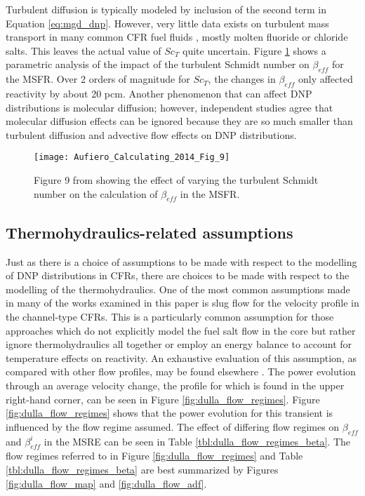 \documentclass[review]{elsarticle}
\begin{document}
Turbulent diffusion is typically modeled by inclusion of the second term in
Equation \ref{eq:mgd_dnp}. However, 
very little data exists on turbulent mass transport in many common
CFR fuel fluids \cite{aufiero_calculating_2014}, mostly molten fluoride or chloride salts. This leaves the
actual value of $Sc_{T}$ quite uncertain. Figure \ref{fig:aufiero_sc}
\cite{aufiero_calculating_2014} shows a parametric analysis of the impact of the
turbulent Schmidt number on $\beta_{eff}$ for the MSFR. 
Over 2 orders of magnitude for $Sc_{T}$, the changes in
$\beta_{eff}$ only
affected reactivity by about 20 pcm.
Another phenomenon that can affect DNP distributions
is molecular diffusion; however, independent studies \cite{aufiero_calculating_2014}
\cite{cheng_development_2014} agree that molecular diffusion effects can be ignored because they are so much smaller
than turbulent diffusion and advective flow effects on DNP distributions.

\begin{figure}[H]
   \centering
   \texttt{[image: Aufiero\_Calculating\_2014\_Fig\_9]}
   \caption{Figure 9 from \cite{aufiero_calculating_2014} showing the effect of varying
   the turbulent Schmidt number on the calculation of $\beta_{eff}$ in the MSFR.}
   \label{fig:aufiero_sc}
\end{figure}

\subsection{Thermohydraulics-related assumptions} \label{th_asm}
Just as there is a choice of assumptions to be made with respect to the
modelling of DNP distributions in CFRs, there are choices to be
made with respect to the modelling of the thermohydraulics. One of the most
common assumptions made in many of the works examined in this paper is 
slug flow for the velocity profile in the channel-type CFRs. This is a
particularly common assumption for those approaches which do not explicitly
model the fuel salt flow in the core but rather ignore thermohydraulics
all together or employ an energy balance to account for temperature effects
on reactivity. An exhaustive evaluation
of this assumption, as compared with other flow profiles, may be found elsewhere \cite{dulla_interactions_2007}.
The power evolution through an average velocity change, the profile for which
is found
in the upper right-hand corner, can be seen in Figure 
\ref{fig:dulla_flow_regimes}. Figure \ref{fig:dulla_flow_regimes}
shows that the power evolution for this transient is 
influenced by the flow regime assumed. The effect of differing flow regimes
on $\beta_{eff}$ and $\beta_{eff}^{i}$ in the MSRE can be seen in Table
\ref{tbl:dulla_flow_regimes_beta}. The flow regimes referred to in Figure
\ref{fig:dulla_flow_regimes} and Table \ref{tbl:dulla_flow_regimes_beta} are
best 
summarized by Figures \ref{fig:dulla_flow_map} and \ref{fig:dulla_flow_adf}.
\end{document}
